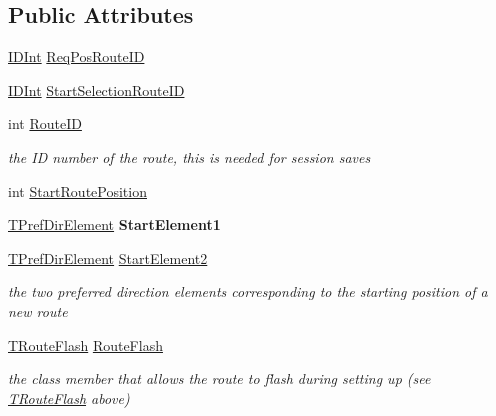 \subsection*{Public Attributes}
\begin{DoxyCompactItemize}
\item 
\mbox{\hyperlink{class_i_d_int}{I\+D\+Int}} \mbox{\hyperlink{class_t_one_route_aee7b2c91e9920bbb59c84cb562f0680a}{Req\+Pos\+Route\+ID}}
\item 
\mbox{\hyperlink{class_i_d_int}{I\+D\+Int}} \mbox{\hyperlink{class_t_one_route_a485b30c243956a400f658124d0f4ecd0}{Start\+Selection\+Route\+ID}}
\item 
\mbox{\label{class_t_one_route_a75f84f2ad79c985ff7b664cfecdab376}} 
int \mbox{\hyperlink{class_t_one_route_a75f84f2ad79c985ff7b664cfecdab376}{Route\+ID}}
\begin{DoxyCompactList}\small\item\em the ID number of the route, this is needed for session saves \end{DoxyCompactList}\item 
int \mbox{\hyperlink{class_t_one_route_a5b779b57f966fd9c7c7d1c42f8ecde22}{Start\+Route\+Position}}
\item 
\mbox{\label{class_t_one_route_a884d9f41f6c31abba02933d24a940e22}} 
\mbox{\hyperlink{class_t_pref_dir_element}{T\+Pref\+Dir\+Element}} {\bfseries Start\+Element1}
\item 
\mbox{\label{class_t_one_route_a0e1037a37eafc6f9e3d27cf362ee80ad}} 
\mbox{\hyperlink{class_t_pref_dir_element}{T\+Pref\+Dir\+Element}} \mbox{\hyperlink{class_t_one_route_a0e1037a37eafc6f9e3d27cf362ee80ad}{Start\+Element2}}
\begin{DoxyCompactList}\small\item\em the two preferred direction elements corresponding to the starting position of a new route \end{DoxyCompactList}\item 
\mbox{\label{class_t_one_route_ad5c3066eea66bd42ea847f550e2b0589}} 
\mbox{\hyperlink{class_t_one_route_1_1_t_route_flash}{T\+Route\+Flash}} \mbox{\hyperlink{class_t_one_route_ad5c3066eea66bd42ea847f550e2b0589}{Route\+Flash}}
\begin{DoxyCompactList}\small\item\em the class member that allows the route to flash during setting up (see \mbox{\hyperlink{class_t_one_route_1_1_t_route_flash}{T\+Route\+Flash}} above) \end{DoxyCompactList}\end{DoxyCompactItemize}

